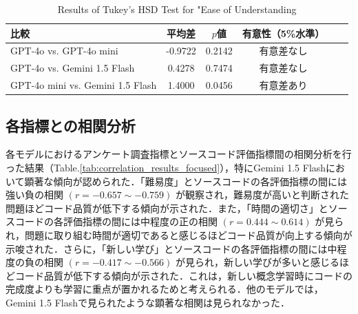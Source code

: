 \documentclass[twocolumn, fleqn, uplatex]{jsarticle}
\begin{document}
\begin{table}[t]
\centering
\scriptsize
\caption{Results of Tukey's HSD Test for "Ease of Understanding}
\label{tab:tukey_hsd_understanding}
\begin{tabular}{lccccc}
\hline
比較 & 平均差 & $p$値  & 有意性（5\%水準） \\
\hline
GPT-4o vs. GPT-4o mini & -0.9722 & 0.2142  & 有意差なし \\
GPT-4o vs. Gemini 1.5 Flash & 0.4278 & 0.7474  & 有意差なし \\
GPT-4o mini vs. Gemini 1.5 Flash & 1.4000 & 0.0456 & 有意差あり \\
\hline
\end{tabular}
\end{table}

\subsection{各指標との相関分析}

各モデルにおけるアンケート調査指標とソースコード評価指標間の相関分析を行った結果（Table.\ref{tab:correlation_results_focused}），特にGemini 1.5 Flashにおいて顕著な傾向が認められた．「難易度」とソースコードの各評価指標の間には強い負の相関 $(r=−0.657\sim−0.759)$ が観察され，難易度が高いと判断された問題ほどコード品質が低下する傾向が示された．また，「時間の適切さ」とソースコードの各評価指標の間には中程度の正の相関 $(r=0.444\sim0.614)$ が見られ，問題に取り組む時間が適切であると感じるほどコード品質が向上する傾向が示唆された．さらに，「新しい学び」とソースコードの各評価指標の間には中程度の負の相関 $(r=−0.417\sim−0.566)$ が見られ，新しい学びが多いと感じるほどコード品質が低下する傾向が示された．これは，新しい概念学習時にコードの完成度よりも学習に重点が置かれるためと考えられる．他のモデルでは，Gemini 1.5 Flashで見られたような顕著な相関は見られなかった．
\end{document}
